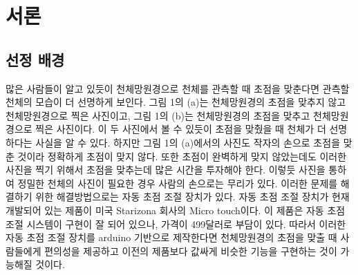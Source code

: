 \documentclass{abstract_hutech}
\begin{document}
\thispagestyle{firstpage}

\section{서론}

\subsection{선정 배경}

많은 사람들이 알고 있듯이 천체망원경으로 천체를 관측할 때 초점을 맞춘다면 관측할 천체의 모습이 더 선명하게 보인다. 그림 1의 (a)는 천체망원경의 초점을 맞추지 않고 천체망원경으로 찍은 사진이고, 그림 1의 (b)는 천체망원경의 초점을 맞추고 천체망원경으로 찍은 사진이다. 이 두 사진에서 볼 수 있듯이 초점을 맞췄을 때 천체가 더 선명하다는 사실을 알 수 있다. 하지만 그림 1의 (a)에서의 사진도 작자의 손으로 초점을 맞춘 것이라 정확하게 초점이 맞지 않다. 또한 초점이 완벽하게 맞지 않았는데도 이러한 사진을 찍기 위해서 초점을 맞추는데 많은 시간을 투자해야 한다. 이렇듯 사진을 통하여 정밀한 천체의 사진이 필요한 경우 사람의 손으로는 무리가 있다. 이러한 문제를 해결하기 위한 해결방법으로는 자동 초점 조절 장치가 있다. 자동 초점 조절 장치가 현재 개발되어 있는 제품이 미국 Starizona 회사의 Micro touch이다. 이 제품은 자동 초점 조절 시스템이 구현이 잘 되어 있으나, 가격이 499달러로 부담이 있다. 따라서 이러한 자동 초점 조절 장치를 arduino 기반으로 제작한다면 천체망원경의 초점을 맞출 때 사람들에게 편의성을 제공하고 이전의 제품보다 값싸게 비슷한 기능을 구현하는 것이 가능해질 것이다.
\end{document}
